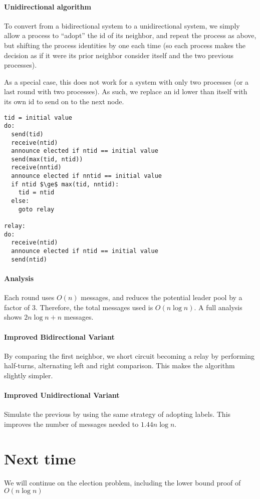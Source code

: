 \documentclass{idc_msc}
\begin{document}
\paragraph{Unidirectional algorithm}


To convert from a bidirectional system to a unidirectional system, we simply allow a process to ``adopt'' the id of its neighbor, and repeat the process as above, but shifting the process identities by one each time (so each process makes the decision as if it were its prior neighbor consider itself and the two previous processes).

As a special case, this does not work for a system with only two processes (or a last round with two processes).
As such, we replace an id lower than itself with its own id to send on to the next node.

\begin{lstlisting}[frame=L,mathescape=true,title={For processes $i=1...n$}]
tid = initial value
do:
  send(tid)
  receive(ntid)
  announce elected if ntid == initial value
  send(max(tid, ntid))
  receive(nntid)
  announce elected if nntid == initial value
  if ntid $\ge$ max(tid, nntid):
    tid = ntid
  else:
    goto relay

relay:
do:
  receive(ntid)
  announce elected if ntid == initial value
  send(ntid)
\end{lstlisting}

\paragraph{Analysis}
Each round uses $O(n)$ messages, and reduces the potential leader pool by a factor of $3$.
Therefore, the total messages used is $O(n \log n)$.
A full analysis shows $2n \log n + n$ messages.

\paragraph{Improved Bidirectional Variant}
By comparing the first neighbor, we short circuit becoming a relay by performing half-turns, alternating left and right comparison.
This makes the algorithm slightly simpler.

\paragraph{Improved Unidirectional Variant}
Simulate the previous by using the same strategy of adopting labels.
This improves the number of messages needed to $1.44 n \log n$.

\section{Next time}
We will continue on the election problem, including the lower bound proof of $O(n\log n)$
\end{document}
